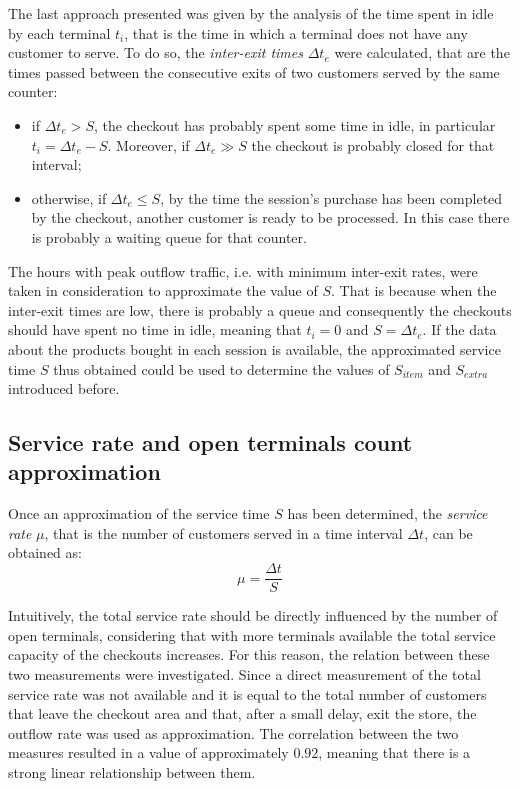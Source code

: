 The last approach presented was given by the analysis of the time spent in idle by each terminal \( t_i \), that is the time in which a terminal does not have any customer to serve. To do so, the \emph{inter-exit times} \( \Delta t_e \) were calculated, that are the times passed between the consecutive exits of two customers served by the same counter:
\begin{itemize}
  \item if \( \Delta t_e > S \), the checkout has probably spent some time in idle, in particular \( t_i = \Delta t_e - S \). Moreover, if \( \Delta t_e \gg S \) the checkout is probably closed for that interval;
  \item otherwise, if \( \Delta t_e \le S \), by the time the session’s purchase has been completed by the checkout, another customer is ready to be processed. In this case there is probably a waiting queue for that counter.
\end{itemize}

The hours with peak outflow traffic, i.e. with minimum inter-exit rates, were taken in consideration to approximate the value of \( S \). That is because when the inter-exit times are low, there is probably a queue and consequently the checkouts should have spent no time in idle, meaning that \( t_i = 0 \) and \( S = \Delta t_e \). If the data about the products bought in each session is available, the approximated service time \( S \) thus obtained could be used to determine the values of \( S_{item} \) and \( S_{extra} \) introduced before.

\subsection{Service rate and open terminals count approximation}
\label{subsec:service_rate_and_open_terminals_count_approximation}

Once an approximation of the service time \( S \) has been determined, the \emph{service rate} \( \mu \), that is the number of customers served in a time interval \( \Delta t \), can be obtained as:
\begin{equation}
  \mu = \frac{\Delta t}{S}
\end{equation}

Intuitively, the total service rate should be directly influenced by the number of open terminals, considering that with more terminals available the total service capacity of the checkouts increases. For this reason, the relation between these two measurements were investigated. Since a direct measurement of the total service rate was not available and it is equal to the total number of customers that leave the checkout area and that, after a small delay, exit the store, the outflow rate was used as approximation. The correlation between the two measures resulted in a value of approximately \( 0.92 \), meaning that there is a strong linear relationship between them.

